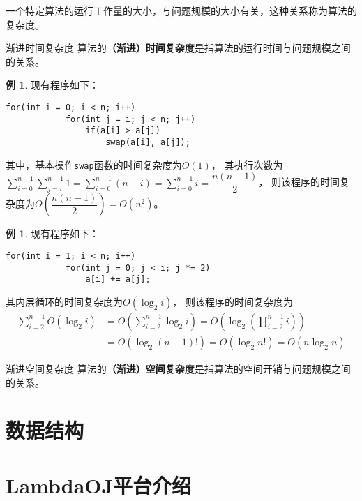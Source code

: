 \documentclass[10pt, a4paper, oneside, fontset=none]{ctexart}
\theoremstyle{plain}
\theoremstyle{definition}
\newtheorem{example}[theorem]{例}
\newcommand{\de}[2][]{\begin{defil}{#1}\kai #2\end{defil}}
\newcommand{\tboba}[1]{\textbf{\kai\color{bali!75!black}#1}}
\begin{document}
一个特定算法的运行工作量的大小，与问题规模的大小有关，这种关系称为算法的复杂度。

\de[渐进时间复杂度]{
    算法的\tboba{（渐进）时间复杂度}是指算法的运行时间与问题规模之间的关系。
}

\begin{example}
    现有程序如下：
    \begin{lstlisting}[gobble=8]
        for(int i = 0; i < n; i++)
            for(int j = i; j < n; j++)
                if(a[i] > a[j])
                    swap(a[i], a[j]);
    \end{lstlisting}
    其中，基本操作\lstinline|swap|函数的时间复杂度为\(O(1)\)，
    其执行次数为\(\sum\limits_{i=0}^{n-1}\sum\limits_{j=i}^{n-1}1 = \sum\limits_{i=0}^{n-1}(n-i) = \sum\limits_{i=0}^{n-1}i = \dfrac{n(n-1)}{2}\)，
    则该程序的时间复杂度为\(O\left(\dfrac{n(n-1)}{2}\right) = O(n^2)\)。
\end{example}

\begin{example}
    现有程序如下：
    \begin{lstlisting}[gobble=8]
        for(int i = 1; i < n; i++)
            for(int j = 0; j < i; j *= 2)
                a[i] += a[j];
    \end{lstlisting}
    其内层循环的时间复杂度为\(O(\log_2i)\)，
    则该程序的时间复杂度为
    \begin{align*}
        \sum\limits_{i=2}^{n-1} O(\log_2i) &= O\left(\sum\limits_{i=2}^{n-1} \log_2i\right)
        = O\left(\log_2\left(\prod\limits_{i=2}^{n-1} i\right)\right) \\
        &= O\left(\log_2(n-1)!\right) = O\left(\log_2n!\right) = O(n\log_2n)
    \end{align*}
\end{example}

\de[渐进空间复杂度]{
    算法的\tboba{（渐进）空间复杂度}是指算法的空间开销与问题规模之间的关系。
}

\section{数据结构}

\newpage
\appendix
\section{LambdaOJ平台介绍}
\end{document}
